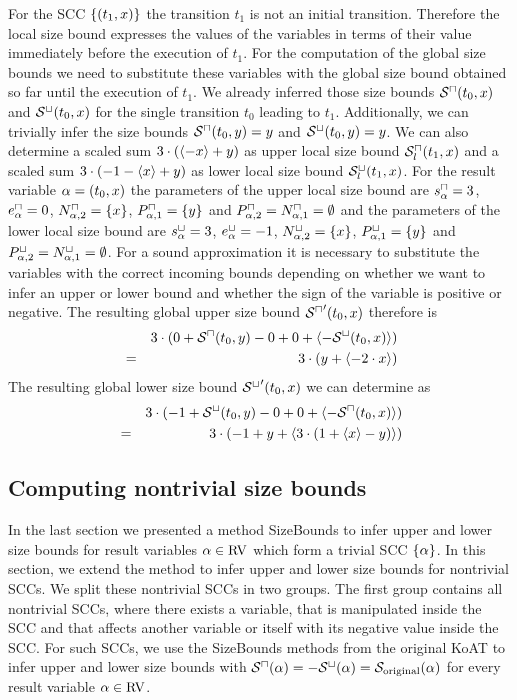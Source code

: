 For the SCC $\lbrace (t_1,x) \rbrace$ the transition $t_1$ is not an initial transition.
Therefore the local size bound expresses the values of the variables in terms of their value immediately before the execution of $t_1$.
For the computation of the global size bounds we need to substitute these variables with the global size bound obtained so far until the execution of $t_1$.
We already inferred those size bounds ${\mathcal{S}^\sqcap}(t_0,x)$ and ${\mathcal{S}^\sqcup}(t_0,x)$ for the single transition $t_0$ leading to $t_1$.
Additionally, we can trivially infer the size bounds ${\mathcal{S}^\sqcap}(t_0,y) = y$ and ${\mathcal{S}^\sqcup}(t_0,y) = y$.
We can also determine a scaled sum $3 \cdot (\langle-x\rangle + y)$ as upper local size bound ${\mathcal{S}^\sqcap_l}(t_1,x)$ and a scaled sum $3 \cdot (-1 - \langle x\rangle + y)$ as lower local size bound ${\mathcal{S}^\sqcup_l}(t_1,x)$.
For the result variable $\alpha = (t_0,x)$ the parameters of the upper local size bound are $s^\sqcap_\alpha = 3$, $e^\sqcap_\alpha = 0$, $N^\sqcap_{\alpha,2} = \lbrace x \rbrace$, $P^\sqcap_{\alpha,1} = \lbrace y \rbrace$ and $P^\sqcap_{\alpha,2} = N^\sqcap_{\alpha,1} = \emptyset$ and the parameters of the lower local size bound are $s^\sqcup_\alpha = 3$, $e^\sqcup_\alpha = -1$, $N^\sqcup_{\alpha,2} = \lbrace x \rbrace$, $P^\sqcup_{\alpha,1} = \lbrace y \rbrace$ and $P^\sqcup_{\alpha,2} = N^\sqcup_{\alpha,1} = \emptyset$.
For a sound approximation it is necessary to substitute the variables with the correct incoming bounds depending on whether we want to infer an upper or lower bound and whether the sign of the variable is positive or negative.
The resulting global upper size bound ${\mathcal{S}^\sqcap}'(t_0,x)$ therefore is 
\begin{align*}
  && 3 \cdot ( 0 + {\mathcal{S}^\sqcap}(t_0, y) - 0 + 0 + \langle-{\mathcal{S}^\sqcup}(t_0, x)\rangle ) \\
  & = & 3 \cdot ( y + \langle-2 \cdot x\rangle )
\end{align*}
The resulting global lower size bound ${\mathcal{S}^\sqcup}'(t_0,x)$ we can determine as
\begin{align*}
  && 3 \cdot ( -1 + {\mathcal{S}^\sqcup}(t_0, y) - 0 + 0 + \langle-{\mathcal{S}^\sqcap}(t_0, x)\rangle ) \\
  & = & 3 \cdot ( -1 + y + \langle3 \cdot (1 + \langle x\rangle - y)\rangle )
\end{align*}


\subsection{Computing nontrivial size bounds}

In the last section we presented a method SizeBounds to infer upper and lower size bounds for result variables $\alpha \in \text{RV}$ which form a trivial SCC $\lbrace \alpha \rbrace$.
In this section, we extend the method to infer upper and lower size bounds for nontrivial SCCs.
We split these nontrivial SCCs in two groups.
The first group contains all nontrivial SCCs, where there exists a variable, that is manipulated inside the SCC and that affects another variable or itself with its negative value inside the SCC.
For such SCCs, we use the SizeBounds methods from the original KoAT to infer upper and lower size bounds with ${\mathcal{S}^\sqcap}(\alpha) = -{\mathcal{S}^\sqcup}(\alpha) = \mathcal{S}_{\text{original}}(\alpha)$ for every result variable $\alpha \in \text{RV}$.

